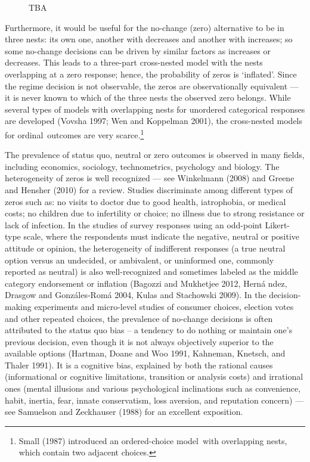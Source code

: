 \documentclass[letterpaper,fleqn,12pt]{article}
\begin{document}
\begin{onehalfspace}
\begin{figure}[H]
\begin{center}
TBA
\end{center}

\end{figure}%

\medskip 

Furthermore, it would be useful for the no-change (zero) alternative to be
in three nests: its own one, another with decreases and another with
increases; so some no-change decisions can be driven by similar factors as
increases or decreases. This leads to a three-part cross-nested model with
the nests overlapping at a zero response; hence, the probability of zeros is
`inflated'. Since the regime decision is not observable, the zeros are
observationally equivalent --- it is never known to which of the three nests
the observed zero belongs. While several types of models with overlapping
nests for unordered categorical responses are developed (Vovsha 1997; Wen
and Koppelman 2001), the cross-nested models for ordinal\ outcomes are very
scarce.\footnote{%
Small (1987) introduced an ordered-choice model\ with overlapping nests,
which contain two adjacent choices.}

The prevalence of status quo, neutral or zero outcomes is observed in many
fields, including economics, sociology, technometrics, psychology and
biology. The heterogeneity of zeros is well recognized --- see Winkelmann
(2008) and Greene and Hensher (2010) for a review. Studies discriminate
among different types of zeros such as: no visits to doctor due to good
health, iatrophobia, or medical costs; no children due to infertility or
choice; no illness due to strong resistance or lack of infection. In the
studies of survey responses using an odd-point Likert-type scale, where the
respondents must indicate the negative, neutral or positive attitude or
opinion, the heterogeneity of indifferent responses (a true neutral option
versus an undecided, or ambivalent, or uninformed one, commonly reported as
neutral) is also well-recognized and sometimes labeled as the middle
category endorsement or inflation (Bagozzi and Mukhetjee 2012, Hern\'{a}%
ndez, Drasgow and Gonz\'{a}les-Rom\'{a} 2004, Kulas and Stachowski 2009). In
the decision-making experiments and micro-level studies of consumer choices,
election votes and other repeated choices, the prevalence of no-change
decisions is often attributed to the status quo bias -- a tendency to do
nothing or maintain one's previous decision, even though it is not always
objectively superior to the available options (Hartman, Doane and Woo 1991,
Kahneman, Knetsch, and Thaler 1991). It is a cognitive bias, explained by
both the rational causes (informational or cognitive limitations, transition
or analysis costs) and irrational ones (mental illusions and various
psychological inclinations such as convenience, habit, inertia, fear, innate
conservatism, loss aversion, and reputation concern) --- see Samuelson and
Zeckhauser (1988) for an excellent exposition.


\end{onehalfspace}
\end{document}
